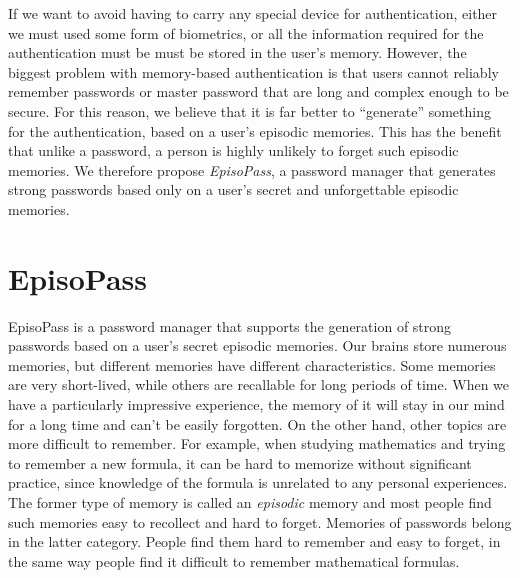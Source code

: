 \documentclass[runningheads,a4paper]{llncs}
\begin{document}
%

If we want to avoid having to carry any special device for authentication,
either we must used some form of biometrics, or all the information required 
for the authentication must be
must be stored in the user's memory.
%
However, the biggest problem with memory-based authentication is that
users cannot reliably remember passwords or master password that are long and complex enough to be secure.
For this reason, we believe that
it is far better to ``generate'' something for the authentication,
based on a user's episodic memories. This has the benefit that unlike a password, a person is highly unlikely to forget such episodic memories.
%
%
We therefore propose \textit{EpisoPass}, a password manager that generates strong passwords
based only on a user's secret and unforgettable episodic memories.

\section{EpisoPass}

EpisoPass is a password manager that supports the generation of
strong passwords based on a user's secret episodic memories.
%
%
Our brains store numerous memories, but different memories have different characteristics.
Some memories are very short-lived, while others are recallable for long periods of time.
When we have a particularly impressive experience,
the memory of it will stay in our mind for a long time and can't be easily forgotten.
On the other hand, other topics are more difficult to remember. For example, when studying mathematics and trying to remember a new formula,
it can be hard to memorize without significant practice,
since knowledge of the formula is unrelated to
any personal experiences.
The former type of memory is called an {\it episodic\/} memory and most people find such
memories easy to recollect and hard to forget.
Memories of passwords belong in the latter category. People find them
hard to remember and easy to forget, in the same way people find it difficult
to remember mathematical formulas.
\end{document}
